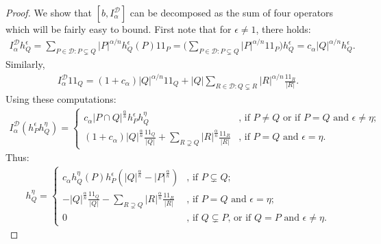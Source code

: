 \documentclass[12pt]{amsart}
\begin{document}
\begin{proof}
We show that $[b,I_{\alpha}^{{\mathcal{{D}}}}]$ can be decomposed
as the sum of four operators which will be fairly easy to bound. First note that for ${\epsilon}\neq 1$, there holds:
\begin{align*}
I_{\alpha}^{{\mathcal{{D}}}}h_Q^{\epsilon}
=\sum_{P\in{\mathcal{{D}}}:P\subsetneq Q}{\ensuremath{\left\vert{P}\right\vert}}^{\alpha/n}h_{Q}^{\epsilon}(P)
  {1\!\!1}_{P}
=\bigg(\sum_{P\in{\mathcal{{D}}}:P\subsetneq Q}{\ensuremath{\left\vert{P}\right\vert}}^{\alpha/n}{1\!\!1}_{P}
  \bigg){h_{{Q}}^{\epsilon}}
=c_{\alpha}{\ensuremath{\left\vert{Q}\right\vert}}^{\alpha/n}{h_{{Q}}^{\epsilon}}.
\end{align*}
Similarly, 
\begin{align*}
I_{\alpha}^{{\mathcal{{D}}}}{1\!\!1}_{Q}
=(1+c_{\alpha}){\ensuremath{\left\vert{Q}\right\vert}}^{\alpha/n}{1\!\!1}_{Q}
  +{\ensuremath{\left\vert{Q}\right\vert}}\sum_{R\in{\mathcal{{D}}}:Q\subsetneq R}
    {\ensuremath{\left\vert{R}\right\vert}}^{\alpha/n}\frac{{1\!\!1}_{R}}{{\ensuremath{\left\vert{R}\right\vert}}}.
\end{align*}
Using these computations:
\begin{align*}
I^{\mathcal{D}}_{\alpha} (h_P^{\epsilon} h_Q^{\eta}) = \left\{
		\begin{array}{ll}
		c_{\alpha} |P \cap Q|^{\frac{\alpha}{n}} h_P^{\epsilon} h_Q^{\eta} & \text{, if } P \neq Q \text{ or if } P=Q \text{ and } {\epsilon}\neq \eta;\\
		(1 + c_{\alpha}) |Q|^{\frac{\alpha}{n}} \frac{{1\!\!1}_Q}{|Q|} + \sum_{R \supsetneq Q} |R|^{\frac{\alpha}{n}} \frac{{1\!\!1}_R}{|R|} & \text{, if } P = Q \text{ and } {\epsilon}=\eta.
		\end{array}
	\right.
\end{align*}
Thus:
\begin{align*}
	[h_P^{\epsilon}, I_{\alpha}^{\mathcal{D}}] h^{\eta}_Q = \left\{
		\begin{array}{ll}
		c_{\alpha} h_Q^{\eta}(P)h_P^{\epsilon} \left( |Q|^{\frac{\alpha}{n}} - |P|^{\frac{\alpha}{n}} \right) & \text{, if } P \subsetneq Q;\\
		-|Q|^{\frac{\alpha}{n}} \frac{{1\!\!1}_Q}{|Q|} - \sum_{R \supsetneq Q} |R|^{\frac{\alpha}{n}} \frac{{1\!\!1}_R}{|R|} & \text{, if } P = Q \text{ and } {\epsilon}=\eta; \\
		0 & \text{, if } Q \subsetneq P \text{, or if } Q = P \text{ and } {\epsilon}\neq\eta. 
		\end{array}
	\right.
\end{align*}

\end{proof}
\end{document}
